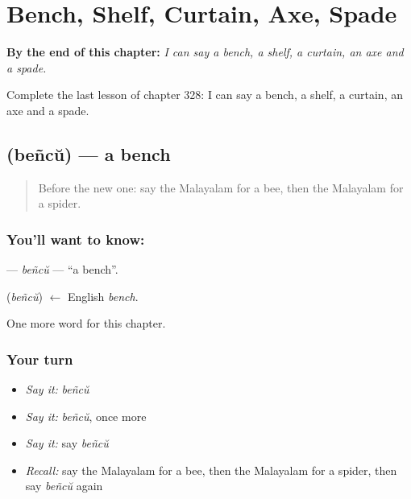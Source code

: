 
\chapter{Bench, Shelf, Curtain, Axe, Spade}
\label{ch:ml-bench-shelf-curtain-axe-spade}

\begin{chapteropening}
\textbf{By the end of this chapter:} \emph{I can say a bench, a shelf, a curtain, an axe and a spade.}

Complete the last lesson of chapter 328: I can say a bench, a shelf, a curtain, an axe and a spade.
\end{chapteropening}

\section[\texorpdfstring{\ml{ബെഞ്ച്} (beñcŭ)}{ബെഞ്ച് (beñcŭ)}]{ (beñcŭ) — a bench}

\label{lesson:ML-C328-bencu}



\begin{quote}
Before the new one: say the Malayalam for a bee, then the Malayalam for a spider.
\end{quote}

\subsection*{You'll want to know: }
\textbf{} — \emph{beñcŭ} — \textquotedblleft{}a bench\textquotedblright{}.

\begin{cousinweb}
\textbf{} (\emph{beñcŭ}) $\leftarrow$ English \emph{bench}.
\end{cousinweb}

\begin{grammarlens}[title={What you've built}]
One more word for this chapter.
\end{grammarlens}

\subsection*{Your turn}
\begin{itemize}
\raggedright
  \item \emph{Say it:} \emph{beñcŭ}
  \item \emph{Say it:} \emph{beñcŭ}, once more
  \item \emph{Say it:} say \emph{beñcŭ}
  \item \emph{Recall:} say the Malayalam for a bee, then the Malayalam for a spider, then say \emph{beñcŭ} again
\end{itemize}

